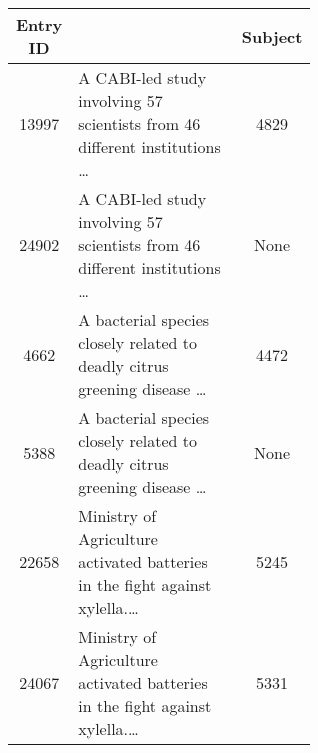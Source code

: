 \begin{table}[!htbp]
\vspace{10pt}

  \begin{tabular}{|c|p{0.6\linewidth}|c|}
    \hline
    \textbf{Entry ID} & \textbf{\trafilaturaAbstract{}}  & \textbf{Subject} \\
    \hline
    13997 & A CABI-led study involving 57 scientists from 46 different institutions \ldots%
    & 4829 \\
    24902 & A CABI-led study involving 57 scientists from 46 different institutions \ldots %
    & None \\ \hline
    4662 & A bacterial species closely related to deadly citrus greening disease \ldots %
    & 4472 \\
    5388 & A bacterial species closely related to deadly citrus greening disease \ldots %
    & None\\ \hline
    22658 & Ministry of Agriculture activated batteries in the fight against xylella.\ldots %
    & 5245 \\
    24067 & Ministry of Agriculture activated batteries in the fight against xylella.\ldots %
    & 5331 \\ 
    \hline
  \end{tabular}

\vspace{10pt}


\end{table}
